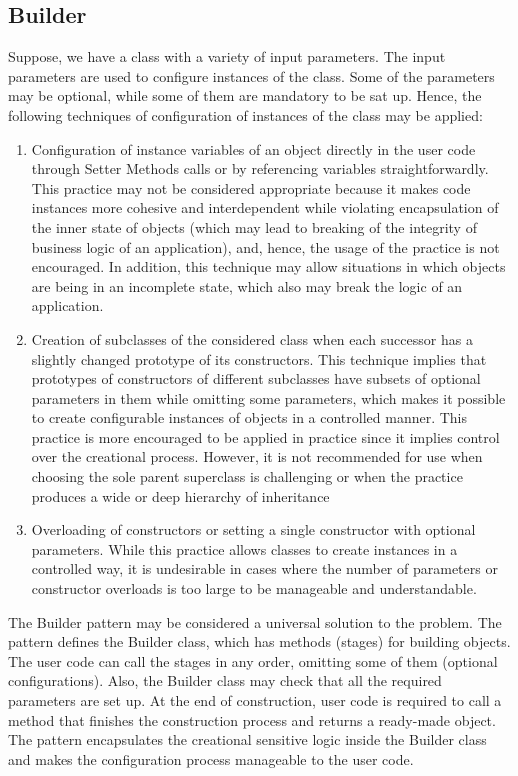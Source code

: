 \documentclass[sigplan,12pt,nonacm=true,review=false]{acmart}
\begin{document}
\subsection{Builder}
Suppose, we have a class with a variety of input parameters. The input parameters are used to configure instances of the class. Some of the parameters may be optional, while some of them are mandatory to be sat up. Hence, the following techniques of configuration of instances of the class may be applied:
\begin{enumerate}
    \item Configuration of instance variables of an object directly in the user code through Setter Methods calls or by referencing variables straightforwardly. This practice may not be considered appropriate because it makes code instances more cohesive and interdependent while violating encapsulation of the inner state of objects (which may lead to breaking of the integrity of business logic of an application), and, hence, the usage of the practice is not encouraged. In addition, this technique may allow situations in which objects are being in an incomplete state, which also may break the logic of an application.
    \item Creation of subclasses of the considered class when each successor has a slightly changed prototype of its constructors. This technique implies that prototypes of constructors of different subclasses have subsets of optional parameters in them while omitting some parameters, which makes it possible to create configurable instances of objects in a controlled manner. This practice is more encouraged to be applied in practice since it implies control over the creational process. However, it is not recommended for use when choosing the sole parent superclass is challenging or when the practice produces a wide or deep hierarchy of inheritance
    \item Overloading of constructors or setting a single constructor with optional parameters. While this practice allows classes to create instances in a controlled way, it is undesirable in cases where the number of parameters or constructor overloads is too large to be manageable and understandable.
\end{enumerate}

The Builder pattern may be considered a universal solution to the problem. The pattern defines the Builder class, which has methods (stages) for building objects. The user code can call the stages in any order, omitting some of them (optional configurations). Also, the Builder class may check that all the required parameters are set up. At the end of construction, user code is required to call a method that finishes the construction process and returns a ready-made object. The pattern encapsulates the creational sensitive logic inside the Builder class and makes the configuration process manageable to the user code.
\end{document}
